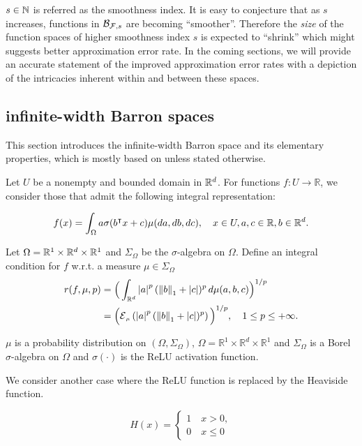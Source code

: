 $s \in \mathbb{N}$ is referred as the smoothness index. It is easy to conjecture
that as $s$ increases, functions in $\mathcal{B}_{\mathcal{F}, s}$ are becoming
``smoother''. Therefore the \textit{size} of the function spaces of higher
smoothness index $s$ is expected to ``shrink'' which might suggests better
approximation error rate. In the coming sections, we will provide an accurate
statement of the improved approximation error rates with a depiction of the
intricacies inherent within and between these spaces.


\subsection{infinite-width Barron spaces}
\label{sec:barron_norm}

This section introduces the infinite-width Barron space and its elementary
properties, which is mostly based on \cite{eBarronSpaceFlowinduced2021} unless
stated otherwise.

Let $U$ be a nonempty and bounded domain in $\mathbb{R}^d$. For functions $f: U \to
\mathbb{R}$, we consider those that admit the following integral representation:

\begin{equation}
    \label{eq:barron_represent}
    f(x) = \int_{\Omega} a \sigma(b{}^{\intercal} x + c) \mu(da, db, dc), \quad 
    x \in U, a,c \in \mathbb{R}, b \in \mathbb{R}^d.
\end{equation}

Let $\Omega = \mathbb{R}^1 \times \mathbb{R}^d \times \mathbb{R}^1$ and $\Sigma_{\Omega}$ be the
$\sigma$-algebra on $\Omega$. Define an integral condition for $f$ w.r.t. a
measure $\mu \in \Sigma_{\Omega}$
\begin{align}
    r(f, \mu, p)
    &= \Big(\int_{\R^d} \abs{a}^p  (\norm{b}_1 + \abs{c})^p \,d\mu(a,b,c)\Big)^{1/p} \\
    &= \Big(\ERWi{\mu}{\abs{a}^p  (\norm{b}_1 + \abs{c})^p}\Big)^{1/p},
    \quad 1 \leq p \leq +\infty.
\end{align}

$\mu$ is a probability distribution on $(\Omega, \Sigma_\Omega)$, $\Omega =
\mathbb{R}^1 \times \mathbb{R}^d \times \mathbb{R}^1$ and $\Sigma_\Omega$ is a
Borel $\sigma$-algebra on $\Omega$ and $\sigma(\cdot)$ is the ReLU activation
function.

We consider another case where the ReLU function is replaced by the Heaviside
function.

\begin{definition}
    \label{eq:heaviside_represent}
    \begin{equation}
        H(x) = 
        \begin{cases}
            1 \quad x > 0,\\
            0 \quad x \leq 0    
        \end{cases}
    \end{equation}
\end{definition}


